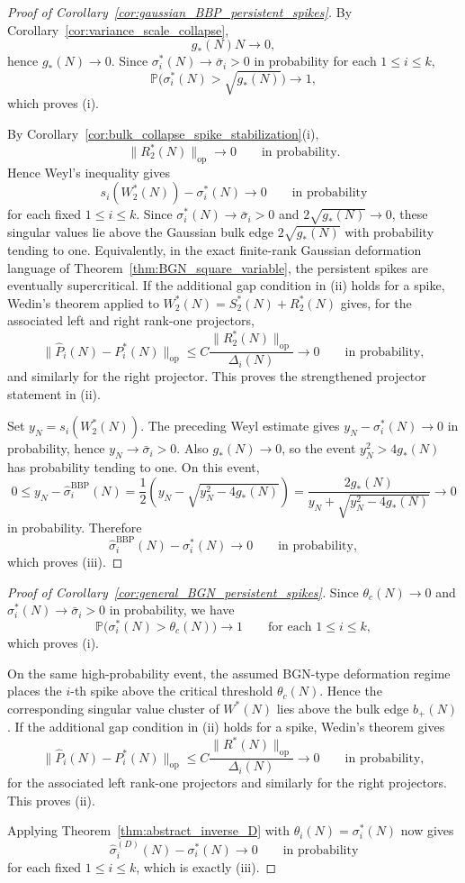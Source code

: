 \documentclass[11pt]{article}
\theoremstyle{plain}
\theoremstyle{definition}
\theoremstyle{remark}
\newcommand{\PP}{\mathbb{P}}
\newcommand{\op}{\mathrm{op}}
\newcommand{\1}{\mathbf{1}}
\begin{document}
\begin{proof}[Proof of Corollary~\ref{cor:gaussian_BBP_persistent_spikes}]
By Corollary~\ref{cor:variance_scale_collapse},
\[
g_*(N)N\to0,
\]
hence \(g_*(N)\to0\). Since \(\sigma_i^*(N)\to\bar\sigma_i>0\) in probability for each \(1\le i\le k\),
\[
\PP\!\big(\sigma_i^*(N)>\sqrt{g_*(N)}\big)\to1,
\]
which proves (i).

By Corollary~\ref{cor:bulk_collapse_spike_stabilization}(i),
\[
\|R_2^*(N)\|_{\op}\to0
\qquad\text{in probability}.
\]
Hence Weyl's inequality gives
\[
s_i(W_2^*(N))-\sigma_i^*(N)\to0
\qquad\text{in probability}
\]
for each fixed \(1\le i\le k\). Since \(\sigma_i^*(N)\to\bar\sigma_i>0\) and \(2\sqrt{g_*(N)}\to0\), these singular values lie above the Gaussian bulk edge \(2\sqrt{g_*(N)}\) with probability tending to one. Equivalently, in the exact finite-rank Gaussian deformation language of Theorem~\ref{thm:BGN_square_variable}, the persistent spikes are eventually supercritical. If the additional gap condition in (ii) holds for a spike, Wedin's theorem applied to \(W_2^*(N)=S_2^*(N)+R_2^*(N)\) gives, for the associated left and right rank-one projectors,
\[
\|\widehat P_i(N)-P_i^*(N)\|_{\op}
\le
C\frac{\|R_2^*(N)\|_{\op}}{\Delta_i(N)}
\to0
\qquad\text{in probability},
\]
and similarly for the right projector. This proves the strengthened projector statement in (ii).

Set \(y_N=s_i(W_2^*(N))\). The preceding Weyl estimate gives \(y_N-\sigma_i^*(N)\to0\) in probability, hence \(y_N\to\bar\sigma_i>0\). Also \(g_*(N)\to0\), so the event \(y_N^2>4g_*(N)\) has probability tending to one. On this event,
\[
0\le
y_N-\widehat\sigma_i^{\mathrm{BBP}}(N)
=
\frac12\left(y_N-\sqrt{y_N^2-4g_*(N)}\right)
=
\frac{2g_*(N)}{y_N+\sqrt{y_N^2-4g_*(N)}}
\to0
\]
in probability. Therefore
\[
\widehat\sigma_i^{\mathrm{BBP}}(N)-\sigma_i^*(N)\to0
\qquad\text{in probability},
\]
which proves (iii).
\end{proof}

\begin{proof}[Proof of Corollary~\ref{cor:general_BGN_persistent_spikes}]
Since \(\theta_c(N)\to0\) and \(\sigma_i^*(N)\to\bar\sigma_i>0\) in probability, we have
\[
\PP\!\big(\sigma_i^*(N)>\theta_c(N)\big)\to1
\qquad\text{for each }1\le i\le k,
\]
which proves (i).

On the same high-probability event, the assumed BGN-type deformation regime places the \(i\)-th spike above the critical threshold \(\theta_c(N)\). Hence the corresponding singular value cluster of \(W^*(N)\) lies above the bulk edge \(b_+(N)\). If the additional gap condition in (ii) holds for a spike, Wedin's theorem gives
\[
\|\widehat P_i(N)-P_i^*(N)\|_{\op}
\le
C\frac{\|R^*(N)\|_{\op}}{\Delta_i(N)}
\to0
\qquad\text{in probability},
\]
for the associated left rank-one projectors and similarly for the right projectors. This proves (ii).

Applying Theorem~\ref{thm:abstract_inverse_D} with \(\theta_i(N)=\sigma_i^*(N)\) now gives
\[
\widehat\sigma_i^{(D)}(N)-\sigma_i^*(N)\to0
\qquad\text{in probability}
\]
for each fixed \(1\le i\le k\), which is exactly (iii).
\end{proof}
\end{document}
